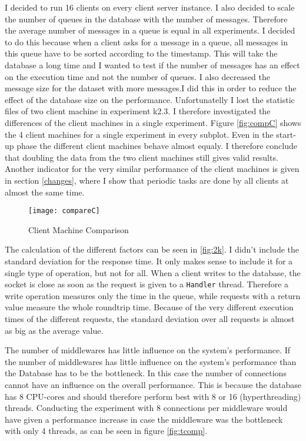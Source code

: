 \documentclass[
10pt, %
a4paper, %
oneside, %
headinclude,footinclude, %
BCOR5mm, %
]{scrartcl}
\begin{document}
I decided to run 16 clients on every client server instance. I also decided to scale the number of queues in the database with the number of messages. Therefore the average number of messages in a queue is equal in all experiments. I decided to do this because when a client asks for a message in a queue, all messages in this queue have to be sorted according to the timestamp. This will take the database a long time and I wanted to test if the number of messages has an effect on the execution time and not the number of queues. I also decreased the message size for the dataset with more messages.I did this in order to reduce the effect of the database size on the performance.
Unfortunatelly I lost the statistic files of two client machine in experiment k2.3. I therefore investigated the differences of the client machines in a single experiment. Figure \vref{fig:compC} shows the 4 client machines for a single experiment in every subplot. Even in the start-up phase the different client machines behave almost equaly. I therefore conclude that doubling the data from the two client machines still gives valid results. Another indicator for the very similar performance of the client machines is given in section \vref{changes}, where I show that periodic tasks are done by all clients at almost the same time.


\begin{figure}[H]
\begin{adjustwidth}{-2in}{-2in}
\centering
\texttt{[image: compareC]}
\caption{Client Machine Comparison}
\label{fig:compC}
\end{adjustwidth}
\end{figure}


The calculation of the different factors can be seen in \vref{fig:2k}. I didn't include the standard deviation for the response time. It only makes sense to include it for a single type of operation, but not for all. When a client writes to the database, the socket is close as soon as the request is given to a \texttt{Handler} thread. Therefore a write operation measures only the time in the queue, while requests with a return value measure the whole roundtrip time. Because of the very different execution times of the different requests, the standard deviation over all requests is almost as big as the average value.

The number of middlewares has little influence on the system's performance. If the number of middlewares has little influence on the system's performance than the Database has to be the bottleneck. In this case the number of connections cannot have an influence on the overall performance. This is because the database has 8 CPU-cores and should therefore perform best with 8 or 16 (hyperthreading) threads. Conducting the experiment with 8 connections per middleware would have given a performance increase in case the middleware was the bottleneck with only 4 threads, as can be seen in figure \vref{fig:tcomp}.
\end{document}
